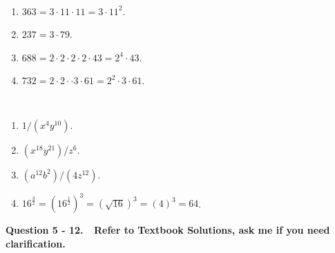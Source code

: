\documentclass[12pt]{article} %
\theoremstyle{ex}
\begin{document}
\begin{qstn}
  \begin{solution} \texttt{  }
    \begin{enumerate}[label=(\alph*)]
      \item $363 = 3\cdot 11\cdot 11 = 3\cdot 11^2$.
      \item $237 = 3 \cdot 79$.
      \item $688 = 2\cdot 2\cdot 2\cdot 2\cdot 43 = 2^{4}\cdot 43$.
      \item $732 = 2\cdot 2\cdot \cdot 3\cdot 61 = 2^2\cdot 3\cdot 61$.
    \end{enumerate}
  \end{solution}
\end{qstn}

\begin{qstn}
  \begin{solution} \texttt{  }
    \begin{enumerate}[label=(\alph*)]
      \item  $1 / (x^{4}y^{10})$.
      \item $(x^{18}y^{21}) / z^{6}$.
      \item $(a^{12}b^2) / (4z^{12})$.
      \item $16^{\frac{3}{2}} = (16^{\frac{1}{2}})^{3} = \left( \sqrt{16}  \right) ^{3} = \left( 4 \right) ^3 =
        64$.
    \end{enumerate}
  \end{solution}
\end{qstn}

\textbf{Question 5 - 12. \,\, Refer to Textbook Solutions, ask me if you need clarification.}
\end{document}
